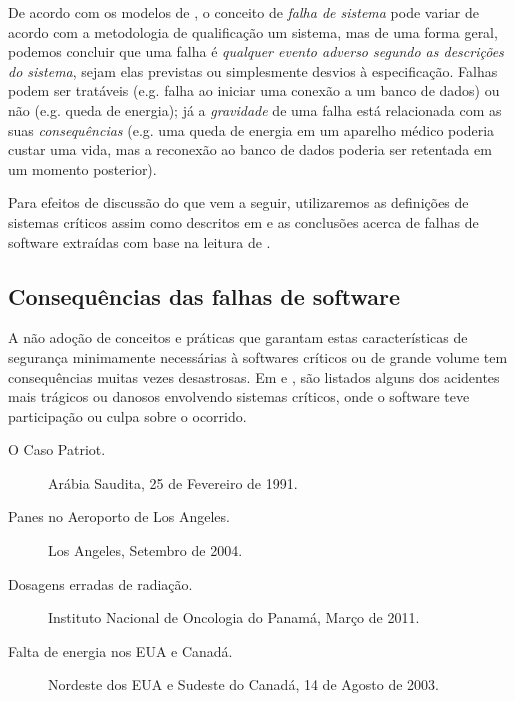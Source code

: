     De acordo com os modelos de \citeauthor{rushby_critical_1994}, o conceito 
    de \emph{falha de sistema} pode variar de acordo com a metodologia de
    qualificação um sistema, mas de uma forma geral, podemos concluir que uma 
    falha é \emph{qualquer evento adverso segundo as descrições do sistema}, 
    sejam elas previstas ou simplesmente desvios à especificação. Falhas podem 
    ser tratáveis (e.g. falha ao iniciar uma conexão a um banco de dados) ou 
    não (e.g. queda de energia); já a \emph{gravidade} de uma falha está 
    relacionada com as suas \emph{consequências} (e.g. uma queda de energia em 
    um aparelho médico poderia custar uma vida, mas a reconexão ao banco de 
    dados poderia ser retentada em um momento posterior).
    
    Para efeitos de discussão do que vem a seguir, utilizaremos as definições 
    de sistemas críticos assim como descritos em 
     e as conclusões acerca de falhas de 
    software extraídas com base na leitura de .
    
    
    \subsection{Consequências das falhas de software}
    
    A não adoção de conceitos e práticas que garantam estas características de 
    segurança minimamente necessárias à softwares críticos ou de 
    grande volume tem consequências muitas vezes desastrosas. 
    Em  e , são 
    listados alguns dos acidentes mais trágicos ou danosos envolvendo sistemas 
    críticos, onde o software teve participação ou culpa sobre o ocorrido.
    
    \begin{description}
        \item[O Caso Patriot.] Arábia Saudita, 25 de Fevereiro de 1991. 
        
        
        \item[Panes no Aeroporto de Los Angeles.] Los Angeles, Setembro de 
        2004.
        
        \item[Dosagens erradas de radiação.] Instituto Nacional de 
        Oncologia do Panamá, Março de 2011.
        
        \item[Falta de energia nos EUA e Canadá.] Nordeste dos EUA e Sudeste do 
        Canadá, 14 de Agosto de 2003.
    \end{description} 
    
